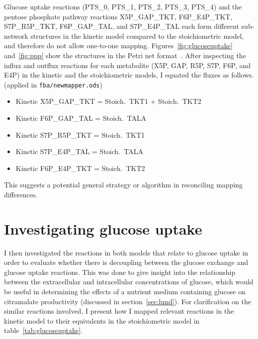 \documentclass[parskip=full, numbers=noenddot]{scrreprt}
\begin{document}
Glucose uptake reactions (PTS\_0, PTS\_1, PTS\_2, PTS\_3, PTS\_4) and the pentose phosphate pathway reactions X5P\-\_GAP\-\_TKT, F6P\-\_E4P\-\_TKT, S7P\-\_R5P\-\_TKT, F6P\-\_GAP\-\_TAL, and S7P\-\_E4P\-\_TAL each form different sub-network structures in the kinetic model compared to the stoichiometric model, and therefore do not allow one-to-one mapping. Figures~\ref{fig:glucoseuptake} and~\vref{fig:ppp} show the structures in the Petri net format~\cite{gilbert_unifying_2007, murata_petri_1989}. After inspecting the influx and outflux reactions for each metabolite (X5P, GAP, R5P, S7P, F6P, and E4P) in the kinetic and the stoichiometric models, I equated the fluxes as follows. (applied in \texttt{fba/newmapper.ods})

\begin{itemize}
\item Kinetic X5P\_GAP\_TKT = Stoich.\ TKT1 + Stoich.\ TKT2
\item Kinetic F6P\_GAP\_TAL = Stoich.\ TALA
\item Kinetic S7P\_R5P\_TKT = Stoich.\ TKT1
\item Kinetic S7P\_E4P\_TAL = Stoich.\ TALA
  \item Kinetic F6P\_E4P\_TKT = Stoich.\ TKT2
\end{itemize}

This suggests a potential general strategy or algorithm in reconciling mapping differences.

\section{Investigating glucose uptake}
\label{sec:glucoseuptake}

I then investigated the reactions in both models that relate to glucose uptake in order to evaluate whether there is decoupling between the glucose exchange and glucose uptake reactions. This was done to give insight into the relationship between the extracellular and intracellular concentrations of glucose, which would be useful in determining the effects of a nutrient medium containing glucose on citramalate productivity (discussed in section~\ref{sec:lund}). For clarification on the similar reactions involved, I present how I mapped relevant reactions in the kinetic model to their equivalents in the stoichiometric model in table~\vref{tab:glucoseuptake}.
\end{document}

